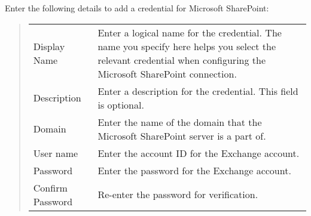 \documentclass[letterpaper,10pt,english]{sphinxmanual}
\begin{document}
Enter the following details to add a credential for Microsoft SharePoint:
\begin{quote}


\begin{savenotes}\sphinxattablestart
\centering
\begin{tabulary}{\linewidth}[t]{|T|T|}
\hline
{}\relax &\relax \\
\hline
Display Name
&
Enter a logical name for the credential. The name you
specify here helps you select the relevant credential when
configuring the Microsoft SharePoint connection.
\\
\hline
Description
&
Enter a description for the credential. This field is optional.
\\
\hline
Domain
&
Enter the name of the domain that the Microsoft SharePoint server
is a part of.
\\
\hline
User name
&
Enter the account ID for the Exchange account.
\\
\hline
Password
&
Enter the password for the Exchange account.
\\
\hline
Confirm Password
&
Re-enter the password for verification.
\\
\hline
\end{tabulary}
\par
\sphinxattableend\end{savenotes}
\end{quote}
\end{document}
